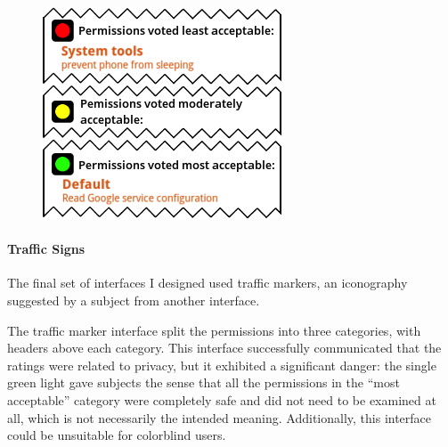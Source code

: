 \documentclass[11pt]{article}
\begin{document}
\begin{figure}
\begin{center}
\includegraphics[width=.9\linewidth]{candidate-img/traffic/trafficR2.png}
\end{center}
\end{figure}

\paragraph{Traffic Signs}
\label{s-sec-traffic}

The final set of interfaces I designed used traffic markers, 
an iconography suggested by a subject from another interface.

\label{ss-sec-traffic-r2}

The traffic marker interface split the permissions into three categories, with headers above
each category.
This interface successfully communicated that the ratings were related to privacy, 
but it exhibited a significant danger: the single green light gave subjects
the sense that all the permissions in the ``most acceptable'' category were 
completely safe and did
not need to be examined at all, which is not necessarily the
intended meaning. Additionally, this interface 
could be unsuitable for colorblind users.
\end{document}
